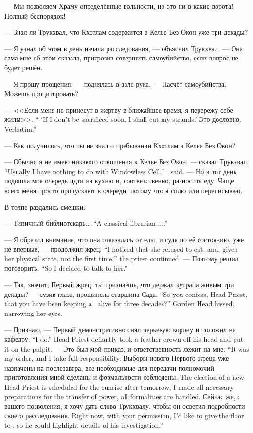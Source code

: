--- Мы позволяем Храму определённые вольности, но это ни в какие ворота!
Полный беспорядок!

--- Знал ли Трукхвал, что Кхотлам содержится в Келье Без Окон уже три декады?

--- Я узнал об этом в день начала расследования, --- объяснил Трукхвал.
--- Она сама мне об этом сказала, пригрозив совершить самоубийство, если вопрос не будет решён.

--- Я прошу прощения, --- поднялась в зале рука.
--- Насчёт самоубийства.
Можешь процитировать?

{--- <<Если меня не принесут в жертву в ближайшее время, я перережу себе жилы>>.}
{`` `If I don't be sacrificed soon, I shall cut my strands.'}
{Это дословно.}
{Verbatim.''}

--- Как получилось, что ты не знал о пребывании Кхотлам в Келье Без Окон?

{--- Обычно я не имею никакого отношения к Келье Без Окон, --- сказал Трукхвал.}
{``Usually I have nothing to do with Windowless Cell,'' \Trukchual\ said.}
--- Но в тот день подошла моя очередь идти на кухню и, соответственно, разносить еду.
Чаще всего меня просто пропускают в очереди, потому что я сплю или переписываю.

В толпе раздались смешки.

{--- Типичный библиотекарь...}
{``A classical librarian ....''}

{--- Я обратил внимание, что она отказалась от еды, и судя по её состоянию, уже не впервые, --- продолжил жрец.}
{``I noticed that she refused to eat, and, given her physical state, not the first time,'' the priest continued.}
{--- Поэтому решил поговорить.}
{``So I decided to talk to her.''}

{--- Так, значит, Первый жрец, ты признаёшь, что держал кутрапа живым три декады? --- сузив глаза, прошипела старшина Сада.}
{``So you confess, Head Priest, that you have been keeping a \kutraph\ alive for three decades?'' Garden Head hissed, narrowing her eyes.}

{--- Признаю, --- Первый демонстративно снял перьевую корону и положил на кафедру.}
{``I do.'' Head Priest defiantly took a feather crown off his head and put it on the pulpit.}
{--- Это был мой приказ, и ответственность лежит на мне.}
{``It was my order, and I take full responsibility.}
{Выборы нового Первого жреца уже назначены на послезавтра, все необходимые для передачи полномочий приготовления мной сделаны и формальности соблюдены.}
{The election of a new Head Priest is scheduled for the sunrise after tomorrow, I made all necessary preparations for the transfer of power, all formalities are handled.}
{Сейчас же, с вашего позволения, я хочу дать слово Трукхвалу, чтобы он осветил подробности своего расследования.}
{Right now, with your permission, I'd like to give the floor to \Trukchual, so he could highlight details of his investigation.''}

